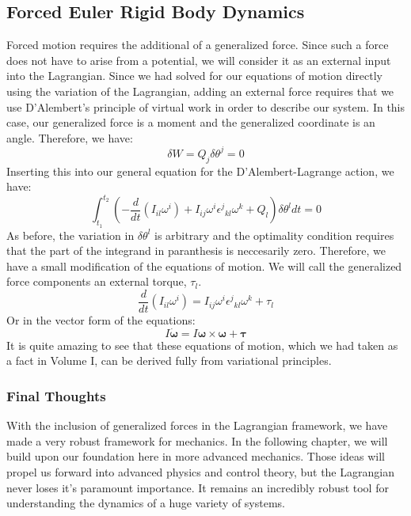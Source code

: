 \subsection{Forced Euler Rigid Body Dynamics}
Forced motion requires the additional of a generalized force. Since such a force does not have to arise from a potential, we will consider it as an external input into the \gls{Lagrangian}. Since we had solved for our equations of motion directly using the variation of the \gls{Lagrangian}, adding an external force requires that we use D'Alembert's principle of virtual work in order to describe our system. In this case, our generalized force is a moment and the generalized coordinate is an angle. Therefore, we have:
$$\delta W=Q_j\delta\theta^j=0$$
Inserting this into our general equation for the D'Alembert-Lagrange action, we have:
$$\int_{t_1}^{t_2}\left(-\frac{d}{dt}(I_{il}\omega^i)+I_{ij}\omega^i{\epsilon^j}_{kl}\omega^k+Q_l\right)\delta\theta^ldt=0$$
As before, the variation in $\delta\theta^l$ is arbitrary and the optimality condition requires that the part of the integrand in paranthesis is neccesarily zero. Therefore, we have a small modification of the equations of motion. We will call the generalized force components an external torque, $\tau_l$.
$$\frac{d}{dt}(I_{il}\omega^i)=I_{ij}\omega^i{\epsilon^j}_{kl}\omega^k+\tau_l$$
Or in the vector form of the equations:
$$I\bm{\dot{\omega}}=I\bm{\omega}\times\bm{\omega}+\bm{\tau}$$
It is quite amazing to see that these equations of motion, which we had taken as a fact in Volume I, can be derived fully from variational principles.

\subsubsection{Final Thoughts}
With the inclusion of generalized forces in the \gls{Lagrangian} framework, we have made a very robust framework for mechanics. In the following chapter, we will build upon our foundation here in more advanced mechanics. Those ideas will propel us forward into advanced physics and control theory, but the \gls{Lagrangian} never loses it's paramount importance. It remains an incredibly robust tool for understanding the dynamics of a huge variety of systems.

